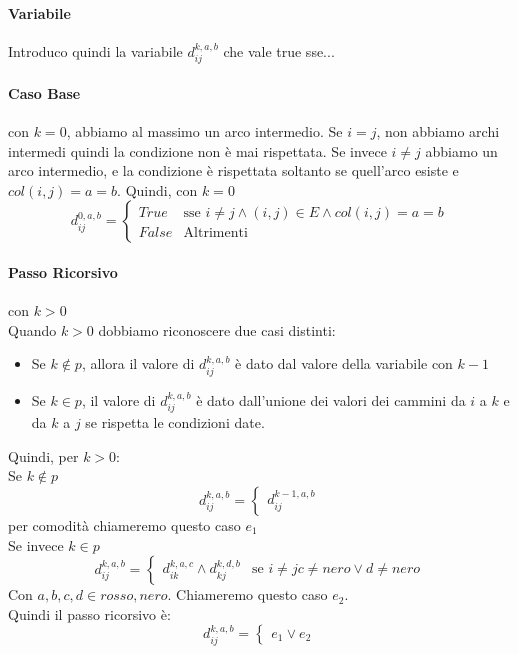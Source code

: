 \documentclass[12pt, a4paper, openany]{book}
\begin{document}
\paragraph*{Variabile}
Introduco quindi la variabile $d_{ij}^{k,a,b}$ che vale true sse...

\paragraph*{Caso Base} con $k=0$, abbiamo al massimo un arco intermedio.
Se $i=j$, non abbiamo archi intermedi quindi la condizione non è mai rispettata.
Se invece $i\neq j$ abbiamo un arco intermedio, e la condizione è rispettata soltanto se quell'arco esiste e $col(i,j)=a=b$.
Quindi, con $k=0$
$$
d_{ij}^{0,a,b}= \begin{cases}
	True & \text{sse } i\neq j \wedge (i,j) \in E \wedge col(i,j) = a = b\\
	False & \text{Altrimenti} 
\end{cases}
$$
\paragraph*{Passo Ricorsivo} con $k>0$\\
Quando $k>0$ dobbiamo riconoscere due casi distinti:
\begin{itemize}
	\item Se $k\notin p$, allora il valore di $d_{ij}^{k,a,b}$ è dato dal valore della variabile con $k-1$
	\item Se $k \in p$, il valore di $d_{ij}^{k,a,b}$ è dato dall'unione dei valori dei cammini da $i$ a $k$ e da $k$ a $j$ se rispetta le condizioni date.
\end{itemize}
Quindi, per $k>0$:
\\Se $k \notin p$
$$d_{ij}^{k,a,b} = \begin{cases}
	d_{ij}^{k-1,a,b}
\end{cases}
$$
per comodità chiameremo questo caso $e_1$
\\Se invece $k\in p$
$$d_{ij}^{k,a,b} = \begin{cases}
	d_{ik}^{k,a,c} \wedge d_{kj}^{k,d,b} & \text{se } i\neq j c\neq nero \vee d \neq nero
\end{cases}
$$
Con $a,b,c,d \in {rosso,nero}$. Chiameremo questo caso $e_2$.
\\Quindi il passo ricorsivo è:
$$
	d_{ij}^{k,a,b} = \begin{cases}
		e_1 \vee e_2
	\end{cases} 
$$
\end{document}

